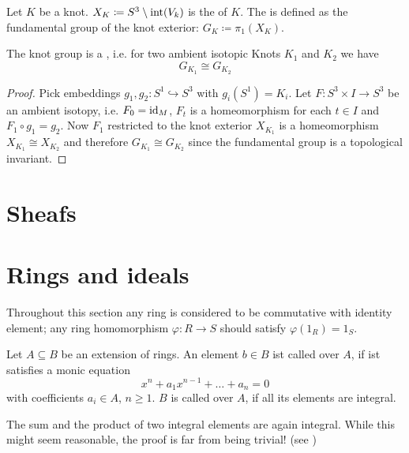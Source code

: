 \begin{definition}
	Let $K$ be a knot. $X_K \coloneqq S^3 \setminus \operatorname{int}(V_k)$ is the  of $K$.
	The  is defined as the fundamental group of the knot exterior: $G_K \coloneqq \pi_1(X_K)$.
\end{definition}

\begin{lemma}
	The knot group is a , i.e. for two ambient isotopic Knots $K_1$ and $K_2$ we have
	\[
		G_{K_1} \cong G_{K_2}
	\]
\end{lemma}
\begin{proof}
	Pick embeddings $g_1, g_2 \colon S^1 \hookrightarrow S^3$ with $g_i(S^1)=K_i$.
	Let $F \colon S^3 \times I \to S^3$ be an ambient isotopy, i.e. $F_0 = {\operatorname{id}_M}$, $F_t$ is a homeomorphism for each $t \in I$ and $F_1 \circ g_1 = g_2$.
	Now $F_1$ restricted to the knot exterior $X_{K_1}$ is a homeomorphism $X_{K_1} \cong X_{K_2}$ and therefore $G_{K_1} \cong G_{K_2}$ since the fundamental group is a topological invariant.
\end{proof}





\section{Sheafs} %
\label{sec:sheafs}



\section{Rings and ideals} %
\label{sec:rings_and_ideals}
Throughout this section any ring is considered to be commutative with identity element; any ring homomorphism $\varphi \colon R \to S$ should satisfy $\varphi(1_R) =1_S$.

\begin{definition}[{name=[Integral Elements]{\cite[Def.~2.1]{neukirch}}}]
	Let $A \subseteq B$ be an extension of rings.
	An element $b \in B$ ist called  over $A$, if ist satisfies a monic equation
	\[
		x^n + a_1 x^{n-1} + \ldots + a_n =0
	\]
	with coefficients $a_i \in A$, $n\ge 1$.
	$B$ is called  over $A$, if all its elements are integral.
\end{definition}

\begin{remark}
	The sum and the product of two integral elements are again integral.
	While this might seem reasonable, the proof is far from being trivial! (see \textcite[Prop.~2.2]{neukirch})
\end{remark}

